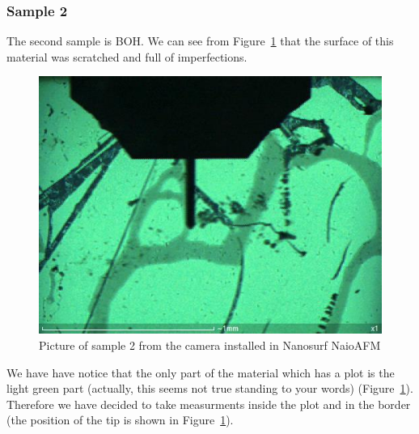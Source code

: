 \documentclass[11pt,a4paper]{article}
\begin{document}
\subsubsection{Sample 2}
The second sample is BOH. We can see from Figure~\ref{fig:sample2_set} that the surface of this material was scratched and full of imperfections.

\begin{figure}[ht]
\centering
\includegraphics[scale=0.4]{sm_sample2_set.JPG}
\caption{Picture of sample 2 from the camera installed in Nanosurf NaioAFM}
\label{fig:sample2_set}
\end{figure}

{\color{red} We have have notice that the only part of the material which has a plot is the light green part (actually, this seems not true standing to your words)} (Figure~\ref{fig:sample2_set}). Therefore we have decided to take measurments inside the plot and in the border (the position of the tip is shown in Figure~\ref{fig:sample2_set}).
\end{document}
